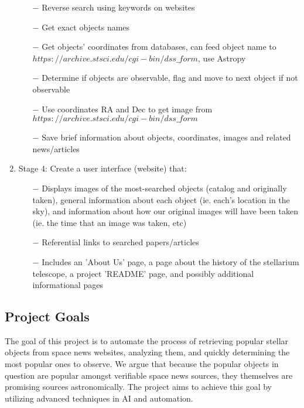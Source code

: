 \documentclass[12pt,letterpaper]{article}
\begin{document}
\begin{enumerate}[leftmargin=*]
    \begin{enumerate}
        \item [$-$] Reverse search using keywords on websites
        \item [$-$] Get exact objects names
        \item [$-$] Get objects' coordinates from databases, can feed object name to $https://archive.stsci.edu/cgi-bin/dss\_form$, use Astropy
        \item [$-$] Determine if objects are observable, flag and move to next object if not observable
        \item [$-$] Use coordinates RA and Dec to get image from $https://archive.stsci.edu/cgi-bin/dss\_form$
        \item [$-$] Save brief information about objects, coordinates, images and related news/articles
    \end{enumerate}
    \item Stage 4: Create a user interface (website) that:
    \begin{enumerate}
        \item [$-$] Displays images of the most-searched objects (catalog and originally taken),
        general information about each object (ie. each's location in the sky), and information about
        how our original images will have been taken (ie. the time that an image was taken, etc)
        \item [$-$] Referential links to searched papers/articles
        \item [$-$] Includes an 'About Us' page, a page about the history of the stellarium telescope, a 
        project 'README' page, and possibly additional informational pages
    \end{enumerate}
\end{enumerate}

\subsection*{Project Goals}
The goal of this project is to automate the process of retrieving popular stellar objects 
from space news websites, analyzing them, and quickly determining the most popular ones to observe. 
We argue that because the popular objects in question are popular amongst verifiable space news sources, 
they themselves are promising sources astronomically. The project aims to achieve this goal by utilizing 
advanced techniques in AI and automation.\\
\end{document}
